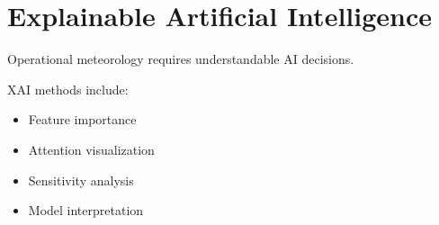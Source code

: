 \section{Explainable Artificial Intelligence}


Operational meteorology requires understandable AI decisions.



XAI methods include:


\begin{itemize}

\item Feature importance

\item Attention visualization

\item Sensitivity analysis

\item Model interpretation

\end{itemize}
